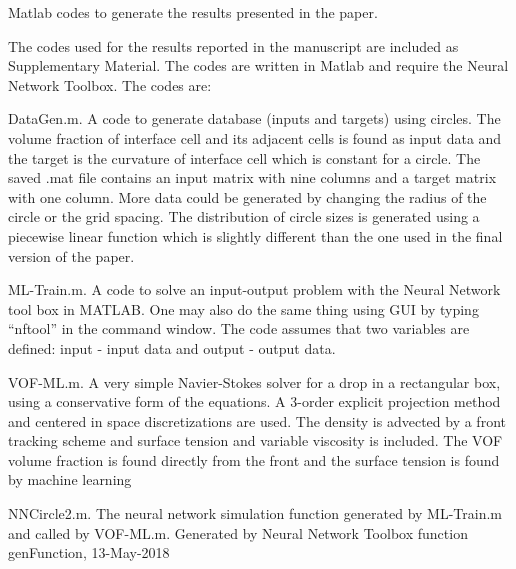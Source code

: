 Matlab codes to generate the results presented in the paper. 

The codes used for the results reported in the manuscript are included as Supplementary Material. The codes are written in Matlab and require the Neural Network Toolbox. The codes are:

DataGen.m. A code to generate database (inputs and targets) using circles. The volume fraction of interface cell and its adjacent cells is found as input data and the target is the curvature of interface cell which is constant for a circle. The saved .mat file contains  an input matrix with nine columns and a target matrix with one column. More data could be generated by changing the radius of the circle or the grid spacing. The distribution of circle sizes is generated using a piecewise linear function which is slightly different than the one used in the final version of the paper.

ML-Train.m. A code to solve an input-output problem with the Neural Network tool box in MATLAB. One may also do the same thing using GUI by typing ``nftool'' in the command window. The code assumes that two variables are defined: input - input data and output - output  data.

VOF-ML.m. A very simple Navier-Stokes solver for a drop in a rectangular box, using a conservative form of the equations.  A 3-order explicit projection method and centered in space discretizations are used. The density is advected by a front tracking scheme and surface tension and variable viscosity is included. The VOF volume fraction is found directly from the front and the surface tension is found by machine learning
 
NNCircle2.m. The neural network simulation function generated by ML-Train.m and called by VOF-ML.m. Generated by Neural Network Toolbox function genFunction, 13-May-2018
